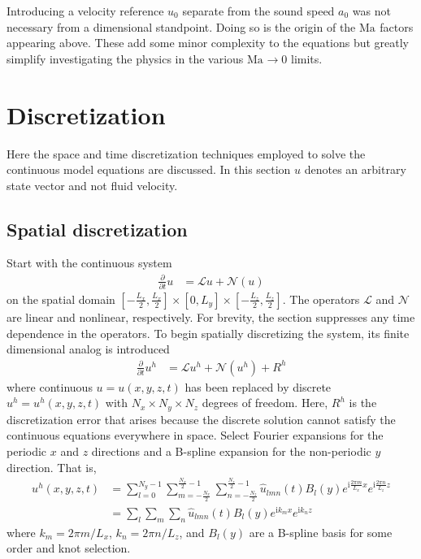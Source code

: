 \documentclass[letterpaper,11pt,nointlimits,reqno,draft]{amsart}
\newcommand{\ii}{\ensuremath{\mathrm{i}}}
\newcommand{\Mach}[1][]{\ensuremath{\mbox{Ma}_{#1}}}
\begin{document}
Introducing a velocity reference $u_{0}$ separate from the sound speed $a_{0}$
was not necessary from a dimensional standpoint.  Doing so is the origin of the
$\Mach$ factors appearing above.  These add some minor complexity to the
equations but greatly simplify investigating the physics in the various
$\Mach\to{}0$ limits.

\section{Discretization}
\label{sec:discretization}

Here the space and time discretization techniques employed to solve the
continuous model equations are discussed.  In this section $u$ denotes an
arbitrary state vector and not fluid velocity.

\subsection{Spatial discretization}
\label{sec:spatialdiscretization}

Start with the continuous system
\begin{align}
  \frac{\partial}{\partial{}t} u &= \mathscr{L}u + \mathscr{N}\!\left(u\right)
\end{align}
on the spatial domain $\left[-\frac{L_x}{2},\frac{L_x}{2}\right] \times{}
[0,L_y] \times{} \left[-\frac{L_z}{2},\frac{L_z}{2}\right]$.  The operators
$\mathscr{L}$ and $\mathscr{N}$ are linear and nonlinear, respectively.  For
brevity, the section suppresses any time dependence in the operators.  To begin
spatially discretizing the system, its finite dimensional analog is introduced
\begin{align}
  \frac{\partial}{\partial{}t} u^h
  &=
  \mathscr{L}u^h + \mathscr{N}\!\left(u^h\right) + R^h
  \label{eq:discrete_system_with_residual}
\end{align}
where continuous $u = u\!\left(x,y,z,t\right)$ has been replaced by discrete
$u^h = u^h\!\left(x,y,z,t\right)$ with $N_x\times{}N_y\times{}N_z$ degrees of
freedom.  Here, $R^h$ is the discretization error that arises because the
discrete solution cannot satisfy the continuous equations everywhere in space.
Select Fourier expansions for the periodic $x$ and $z$ directions and a
B-spline expansion for the non-periodic $y$ direction.  That is,
\begin{align}
u^h(x,y,z,t)
&=
  \sum_{l=0}^{N_y - 1}
  \sum_{m=-\frac{N_x}{2}}^{\frac{N_x}{2}-1}
  \sum_{n=-\frac{N_z}{2}}^{\frac{N_z}{2}-1}
  \hat{u}_{l m n}(t)
  B_l\!\left(y\right)
  e^{\ii\frac{2\pi{}m}{L_x}x}
  e^{\ii\frac{2\pi{}n}{L_z}z}
  \\
&=
  \sum_{l}\sum_{m}\sum_{n}
  \hat{u}_{l m n}(t)B_l\!\left(y\right)e^{\ii k_m x}e^{\ii k_n z}
  \label{eq:u_h_expansion}
\end{align}
where $k_m = 2\pi{}m/L_x$, $k_n = 2\pi{}n/L_z$, and $B_l\!\left(y\right)$ are a
B-spline basis for some order and knot selection.
\end{document}
